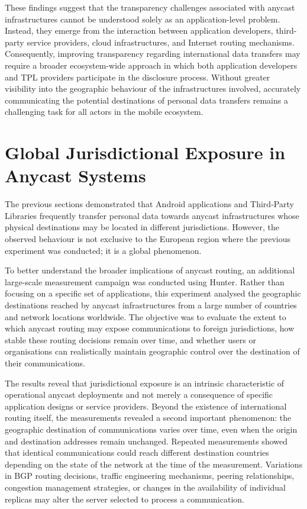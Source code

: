 These findings suggest that the transparency challenges associated with anycast infrastructures cannot be understood solely as an application-level problem. Instead, they emerge from the interaction between application developers, third-party service providers, cloud infrastructures, and Internet routing mechanisms. Consequently, improving transparency regarding international data transfers may require a broader ecosystem-wide approach in which both application developers and TPL providers participate in the disclosure process. Without greater visibility into the geographic behaviour of the infrastructures involved, accurately communicating the potential destinations of personal data transfers remains a challenging task for all actors in the mobile ecosystem.

\section{Global Jurisdictional Exposure in Anycast Systems}
\label{sc:anycast_experiments_global_anycast}


The previous sections demonstrated that Android applications and Third-Party Libraries frequently transfer personal data towards anycast infrastructures whose physical destinations may be located in different jurisdictions. However, the observed behaviour is not exclusive to the European region where the previous experiment was conducted; it is a global phenomenon.

To better understand the broader implications of anycast routing, an additional large-scale measurement campaign was conducted using Hunter. Rather than focusing on a specific set of applications, this experiment analysed the geographic destinations reached by anycast infrastructures from a large number of countries and network locations worldwide. The objective was to evaluate the extent to which anycast routing may expose communications to foreign jurisdictions, how stable these routing decisions remain over time, and whether users or organisations can realistically maintain geographic control over the destination of their communications.

The results reveal that jurisdictional exposure is an intrinsic characteristic of operational anycast deployments and not merely a consequence of specific application designs or service providers. Beyond the existence of international routing itself, the measurements revealed a second important phenomenon: the geographic destination of communications varies over time, even when the origin and destination addresses remain unchanged. Repeated measurements showed that identical communications could reach different destination countries depending on the state of the network at the time of the measurement. Variations in BGP routing decisions, traffic engineering mechanisms, peering relationships, congestion management strategies, or changes in the availability of individual replicas may alter the server selected to process a communication.

